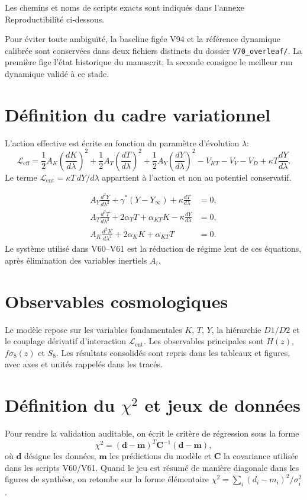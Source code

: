 \documentclass[11pt,a4paper]{article}
\newcommand{\kent}{\kappa} %
\newcommand{\Lent}{\mathcal{L}_{\mathrm{ent}}}
\begin{document}
Les chemins et noms de scripts exacts sont indiqués dans l'annexe Reproductibilité ci‑dessous.

Pour éviter toute ambiguïté, la baseline figée V94 et la référence dynamique calibrée sont conservées dans deux fichiers distincts du dossier \texttt{V70\_overleaf/}. La première fige l'état historique du manuscrit; la seconde consigne le meilleur run dynamique validé à ce stade.


\section{Définition du cadre variationnel}
L'action effective est écrite en fonction du paramètre d'évolution $\lambda$:
\[
\mathcal{L}_{\mathrm{eff}}=\frac12 A_K\left(\frac{dK}{d\lambda}\right)^2+\frac12 A_T\left(\frac{dT}{d\lambda}\right)^2+\frac12 A_Y\left(\frac{dY}{d\lambda}\right)^2 - V_{KT}-V_Y-V_D + \kent T\frac{dY}{d\lambda}.
\]
Le terme $\Lent=\kent T\,dY/d\lambda$ appartient à l'action et non au potentiel conservatif.

\begin{align}
 A_Y\frac{d^2Y}{d\lambda^2}+\gamma^*(Y-Y_\infty)+\kent\frac{dT}{d\lambda} &= 0,\\
 A_T\frac{d^2T}{d\lambda^2}+2\alpha_T T+\alpha_{KT}K-\kent\frac{dY}{d\lambda} &= 0,\\
 A_K\frac{d^2K}{d\lambda^2}+2\alpha_K K+\alpha_{KT}T &= 0.
\end{align}
Le système utilisé dans V60--V61 est la réduction de régime lent de ces équations, après élimination des variables inertiels $A_i$.
\section{Observables cosmologiques}
Le modèle repose sur les variables fondamentales $K$, $T$, $Y$, la hiérarchie $D1/D2$ et le couplage dérivatif d'interaction $\Lent$.
Les observables principales sont $H(z)$, $f\sigma_8(z)$ et $S_8$. Les résultats consolidés sont repris dans les tableaux et figures, avec axes et unités rappelés dans les tracés.

\section{Définition du $\chi^2$ et jeux de données}
Pour rendre la validation auditable, on écrit le critère de régression sous la forme
\[
\chi^2=(\mathbf{d}-\mathbf{m})^T\mathbf{C}^{-1}(\mathbf{d}-\mathbf{m}),
\]
où $\mathbf{d}$ désigne les données, $\mathbf{m}$ les prédictions du modèle et $\mathbf{C}$ la covariance utilisée dans les scripts V60/V61. Quand le jeu est résumé de manière diagonale dans les figures de synthèse, on retombe sur la forme élémentaire $\chi^2=\sum_i (d_i-m_i)^2/\sigma_i^2$.
\end{document}
